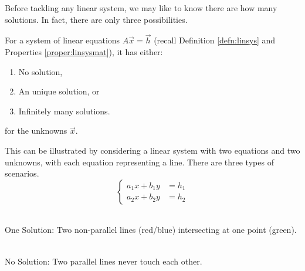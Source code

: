 Before tackling any linear system, we may like to know there are how many solutions. In fact, there are only three possibilities.
\begin{thm}
For a system of linear equations $A\vec{x} = \vec{h}$ (recall Definition \ref{defn:linsys} and Properties \ref{proper:linsysmat}), it has either:
\begin{enumerate}
\item No solution,
\item An unique solution, or
\item Infinitely many solutions.
\end{enumerate}
for the unknowns $\vec{x}$.
\end{thm}
This can be illustrated by considering a linear system with two equations and two unknowns, with each equation representing a line. There are three types of scenarios.
\begin{equation*}
\begin{cases}
a_1x + b_1y &= h_1 \\
a_2x + b_2y &= h_2
\end{cases}   
\end{equation*}
\begin{center}
 \\
One Solution: Two non-parallel lines (red/blue) intersecting at one point (green).
\end{center}
\begin{center}
 \\
No Solution: Two parallel lines never touch each other.
\end{center}
